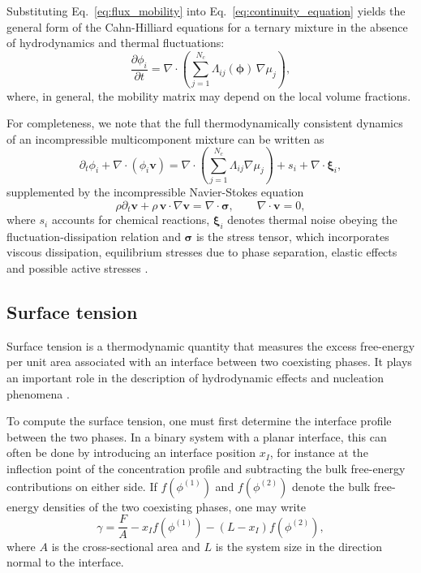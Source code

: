 \documentclass[12pt]{article}
\begin{document}
Substituting Eq.~\eqref{eq:flux_mobility} into Eq.~\eqref{eq:continuity_equation} yields the general form of the Cahn-Hilliard equations for a ternary mixture in the absence of hydrodynamics and thermal fluctuations:
\begin{equation}
\frac{\partial \phi_i}{\partial t}
=
\nabla \cdot
\left(
\sum_{j=1}^{N_c}
\Lambda_{ij}(\boldsymbol{\phi})\,\nabla \mu_j
\right),
\label{eq:cahn_hilliard_general}
\end{equation}
where, in general, the mobility matrix may depend on the local volume fractions.

For completeness, we note that the full thermodynamically consistent dynamics of an incompressible multicomponent mixture can be written as \cite{zwicker2025physicsdropletregulationbiological}
\[
\partial_t \phi_i + \nabla \cdot (\phi_i \boldsymbol{v})
=
\nabla \cdot \left(
\sum_{j=1}^{N_c}\Lambda_{ij}\nabla \mu_j
\right)
+ s_i
+ \nabla \cdot \boldsymbol{\xi}_i,
\]
supplemented by the incompressible Navier-Stokes equation
\[
\rho\partial_t \boldsymbol{v} + \rho\,\boldsymbol{v}\cdot\nabla \boldsymbol{v}
=
\nabla\cdot \boldsymbol{\sigma},
\qquad
\nabla\cdot \boldsymbol{v}=0,
\]
where \(s_i\) accounts for chemical reactions, \(\boldsymbol{\xi}_i\) denotes thermal noise obeying the fluctuation-dissipation relation and \(\boldsymbol{\sigma}\) is the stress tensor, which incorporates viscous dissipation, equilibrium stresses due to phase separation, elastic effects and possible active stresses \cite{annurev:/content/journals/10.1146/annurev.fluid.30.1.139,Michieletto2022Rheology,RevModPhys.85.1143,Ramaswamy_2010}.

\subsection{Surface tension}\label{ss:surface_tension}

Surface tension is a thermodynamic quantity that measures the excess free-energy per unit area associated with an interface between two coexisting phases. It plays an important role in the description of hydrodynamic effects and nucleation phenomena \cite{K_stler_2026,annurev:/content/journals/10.1146/annurev.fluid.30.1.139}.

To compute the surface tension, one must first determine the interface profile between the two phases. In a binary system with a planar interface, this can often be done by introducing an interface position \(x_I\), for instance at the inflection point of the concentration profile and subtracting the bulk free-energy contributions on either side. If \(f(\phi^{(1)})\) and \(f(\phi^{(2)})\) denote the bulk free-energy densities of the two coexisting phases, one may write
\[
\gamma = \frac{F}{A} - x_I f(\phi^{(1)}) - (L-x_I) f(\phi^{(2)}),
\]
where \(A\) is the cross-sectional area and \(L\) is the system size in the direction normal to the interface.
\end{document}
